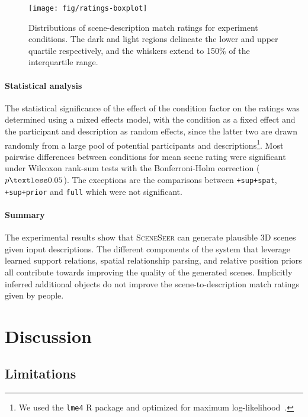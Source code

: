 \documentclass{sigchi}
\newcommand{\stt}[1]{\small{\texttt{#1}}}
\newcommand{\csupspat}{\texttt{+sup+spat}\xspace}
\newcommand{\csupprior}{\texttt{+sup+prior}\xspace}
\newcommand{\cfull}{\texttt{full}\xspace}
\newcommand{\SceneSeer}{\textsc{SceneSeer}\xspace}
\begin{document}
\begin{figure}
  \centering
  \texttt{[image: fig/ratings-boxplot]}
  \caption{Distributions of scene-description match ratings for experiment conditions. The dark and light regions delineate the lower and upper quartile respectively, and the whiskers extend to 150\% of the interquartile range.}
  \label{fig:ratings-boxplot}
\end{figure}

\paragraph{Statistical analysis}
The statistical significance of the effect of the condition factor on the ratings was determined using a mixed effects model, with the condition as a fixed effect and the participant and description as random effects, since the latter two are drawn randomly from a large pool of potential participants and descriptions\footnote{We used the \stt{lme4} R package and optimized for maximum log-likelihood~\cite{baayen2008mixed}.}. Most pairwise differences between conditions for mean scene rating were significant under Wilcoxon rank-sum tests with the Bonferroni-Holm correction ($p\textless0.05$).  The exceptions are the comparisons between \csupspat, \csupprior and \cfull which were not significant.

\paragraph{Summary}
The experimental results show that \SceneSeer can generate plausible 3D scenes given input descriptions.  The different components of the system that leverage learned support relations, spatial relationship parsing, and relative position priors all contribute towards improving the quality of the generated scenes.  Implicitly inferred additional objects do not improve the scene-to-description match ratings given by people.


\section{Discussion}

\subsection{Limitations}
\end{document}
